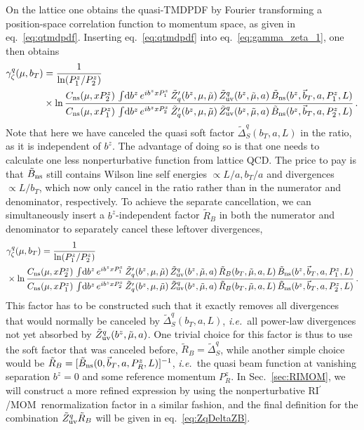 \documentclass[11pt,a4paper]{article}
\DeclareRobustCommand{\eq}[1]{eq.~\eqref{eq:#1}}
\DeclareRobustCommand{\sec}[1]{Sec.~\ref{sec:#1}}
\newcommand{\df}{\mathrm{d}}
\newcommand{\cR}{{\tilde R}}
\newcommand{\nn}{\nonumber}
\newcommand{\bt}{\vec b_T}
\newcommand{\ns}{{\rm ns}}
\newcommand{\RIpMOM}{RI$^\prime$/MOM}
\begin{document}
On the lattice one obtains the quasi-TMDPDF by Fourier transforming a position-space correlation function to momentum space, as given in \eq{qtmdpdf}.
Inserting \eq{qtmdpdf} into \eq{gamma_zeta_1}, one then obtains \cite{Ebert:2018gzl}
\begin{align} \label{eq:gamma_zeta_2}
 \gamma^q_\zeta(\mu, b_T) &= \frac{1}{\ln(P^z_1/P^z_2)}
 \\\nn&\times
 \ln \frac{C_\ns(\mu,x P_2^z)\, \int\! \df b^z\, e^{ib^z xP_1^z}\, \tilde Z_q^\prime(b^z, \mu, \tilde\mu)\,
 \tilde Z_{\rm uv}^{q}(b^z,\tilde \mu, a) \, \tilde B_\ns(b^z, \bt, a, P_1^z, L)}
 {C_\ns(\mu,x P_1^z)\, \int\! \df b^z\, e^{ib^z xP_2^z}\, \tilde Z_q^\prime(b^z, \mu, \tilde\mu)\,
 \tilde Z_{\rm uv}^{q}(b^z,\tilde \mu, a) \, \tilde B_\ns(b^z, \bt, a, P_2^z, L)}
\,.\end{align}
Note that here we have canceled the quasi soft factor $\tilde\Delta_S^q(b_T,a,L)$ in the ratio, as it is independent of $b^z$.
The advantage of doing so is that one needs to calculate one less nonperturbative function from lattice QCD.
The price to pay is that $\tilde B_\ns$ still contains Wilson line self energies $\propto L/a, b_T/a$ and divergences $\propto L/b_T$, which now only cancel in the ratio rather than in the numerator and denominator, respectively.
To achieve the separate cancellation, we can simultaneously insert a $b^z$-independent factor $\cR_B$ in both the numerator and denominator to separately cancel these leftover divergences,
\begin{align} \label{eq:gamma_zeta_2new}
 &\gamma^q_\zeta(\mu, b_T) = \frac{1}{\ln(P^z_1/P^z_2)}
 \\\nn&\times
 \ln \frac{C_\ns(\mu,x P_2^z)\, \int\! \df b^z\, e^{ib^z xP_1^z}\, \tilde Z_q^\prime(b^z, \mu, \tilde\mu)\,
 \tilde Z_{\rm uv}^q(b^z,\tilde \mu, a) \, \cR_B(b_T,\tilde\mu,a,L) \,  \tilde B_\ns(b^z, \bt, a, P_1^z, L)}
 {C_\ns(\mu,x P_1^z)\, \int\! \df b^z\, e^{ib^z xP_2^z}\, \tilde Z_q^\prime(b^z, \mu, \tilde\mu)\,
 \tilde Z_{\rm uv}^q(b^z,\tilde \mu, a) \, \cR_B(b_T,\tilde\mu,a,L) \, \tilde B_\ns(b^z, \bt, a, P_2^z, L)}
\,.\end{align}
This factor has to be constructed such that it exactly removes all divergences that would normally be canceled by $\tilde\Delta_S^q(b_T,a,L)$, \emph{i.e.}\ all power-law divergences not yet absorbed by $\tilde Z_{\rm uv}^q(b^z,\tilde\mu,a)$.
One trivial choice for this factor is thus to use the soft factor that was canceled before, $\cR_B =\tilde\Delta_S^q$, while another simple choice would be $\cR_B = [\tilde B_\ns(0, \bt, a, P_R^z, L)]^{-1}$, \emph{i.e.}\ the quasi beam function at vanishing separation $b^z=0$ and some reference momentum $P_R^z$.
In \sec{RIMOM}, we will construct a more refined expression by using the nonperturbative \RIpMOM\ renormalization factor in a similar fashion, and the final definition for the combination $\tilde Z_{\rm uv}^q \cR_B$ will be given in \eq{ZqDeltaZB}.
\end{document}
